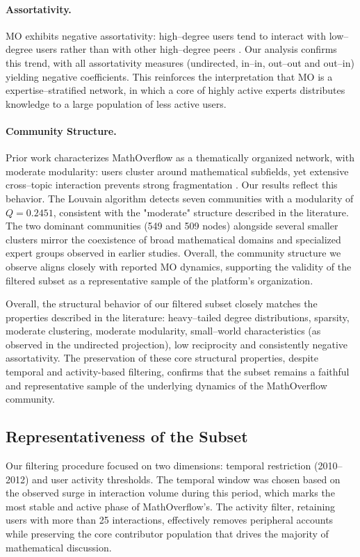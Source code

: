 \documentclass[sigplan]{acmart}
\begin{document}
        \paragraph{Assortativity.}
            MO exhibits negative assortativity: high–degree users tend to interact with low–degree users rather than with other high–degree peers \cite{socialMathoveflow2013}. Our analysis confirms this trend, with all assortativity measures (undirected, in--in, out--out and out--in) yielding negative coefficients. This reinforces the interpretation that MO is a expertise–stratified network, in which a core of highly active experts distributes knowledge to a large population of less active users.

        \paragraph{Community Structure.}
            Prior work characterizes MathOverflow as a thematically organized network, with moderate modularity: users cluster around mathematical subfields, yet extensive cross–topic interaction prevents strong fragmentation \cite{collaborative2012}.
            Our results reflect this behavior. The Louvain algorithm detects seven communities with a modularity of $Q = 0.2451$, consistent with the "moderate" structure described in the literature. The two dominant communities (549 and 509 nodes) alongside several smaller clusters mirror the coexistence of broad mathematical domains and specialized expert groups observed in earlier studies. Overall, the community structure we observe aligns closely with reported MO dynamics, supporting the validity of the filtered subset as a representative sample of the platform’s organization.

        \vspace{12px}
            
        Overall, the structural behavior of our filtered subset closely matches the properties described in the literature: heavy–tailed degree distributions, sparsity, moderate clustering, moderate modularity, small–world characteristics (as observed in the undirected projection), low reciprocity and consistently negative assortativity. The preservation of these core structural properties, despite temporal and activity-based filtering, confirms that the subset remains a faithful and representative sample of the underlying dynamics of the MathOverflow community.
            
    \subsection{Representativeness of the Subset}
        Our filtering procedure focused on two dimensions: temporal restriction (2010–2012) and user activity thresholds. The temporal window was chosen based on the observed surge in interaction volume during this period, which marks the most stable and active phase of MathOverflow's. The activity filter, retaining users with more than 25 interactions, effectively removes peripheral accounts while preserving the core contributor population that drives the majority of mathematical discussion.
        
\end{document}
